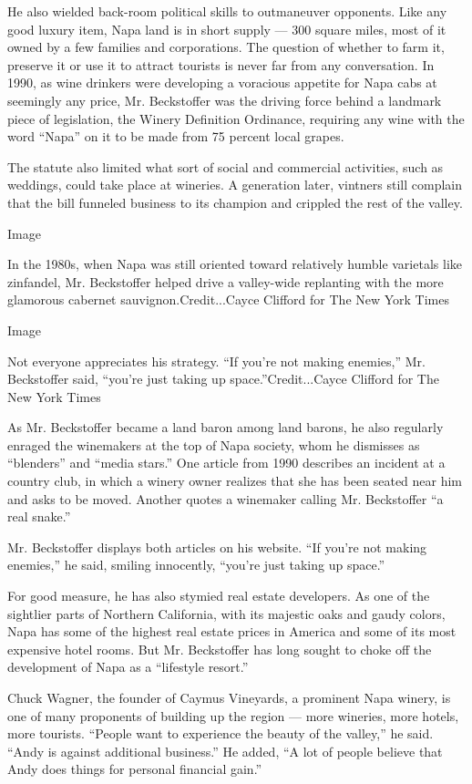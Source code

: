 He also wielded back-room political skills to outmaneuver opponents.
Like any good luxury item, Napa land is in short supply --- 300 square
miles, most of it owned by a few families and corporations. The question
of whether to farm it, preserve it or use it to attract tourists is
never far from any conversation. In 1990, as wine drinkers were
developing a voracious appetite for Napa cabs at seemingly any price,
Mr. Beckstoffer was the driving force behind a landmark piece of
legislation, the Winery Definition Ordinance, requiring any wine with
the word ``Napa'' on it to be made from 75 percent local grapes.

The statute also limited what sort of social and commercial activities,
such as weddings, could take place at wineries. A generation later,
vintners still complain that the bill funneled business to its champion
and crippled the rest of the valley.

Image

In the 1980s, when Napa was still oriented toward relatively humble
varietals like zinfandel, Mr. Beckstoffer helped drive a valley-wide
replanting with the more glamorous cabernet sauvignon.Credit...Cayce
Clifford for The New York Times

Image

Not everyone appreciates his strategy. ``If you're not making enemies,''
Mr. Beckstoffer said, ``you're just taking up space.''Credit...Cayce
Clifford for The New York Times

As Mr. Beckstoffer became a land baron among land barons, he also
regularly enraged the winemakers at the top of Napa society, whom he
dismisses as ``blenders'' and ``media stars.'' One article from 1990
describes an incident at a country club, in which a winery owner
realizes that she has been seated near him and asks to be moved. Another
quotes a winemaker calling Mr. Beckstoffer ``a real snake.''

Mr. Beckstoffer displays both articles on his website. ``If you're not
making enemies,'' he said, smiling innocently, ``you're just taking up
space.''

For good measure, he has also stymied real estate developers. As one of
the sightlier parts of Northern California, with its majestic oaks and
gaudy colors, Napa has some of the highest real estate prices in America
and some of its most expensive hotel rooms. But Mr. Beckstoffer has long
sought to choke off the development of Napa as a ``lifestyle resort.''

Chuck Wagner, the founder of Caymus Vineyards, a prominent Napa winery,
is one of many proponents of building up the region --- more wineries,
more hotels, more tourists. ``People want to experience the beauty of
the valley,'' he said. ``Andy is against additional business.'' He
added, ``A lot of people believe that Andy does things for personal
financial gain.''

